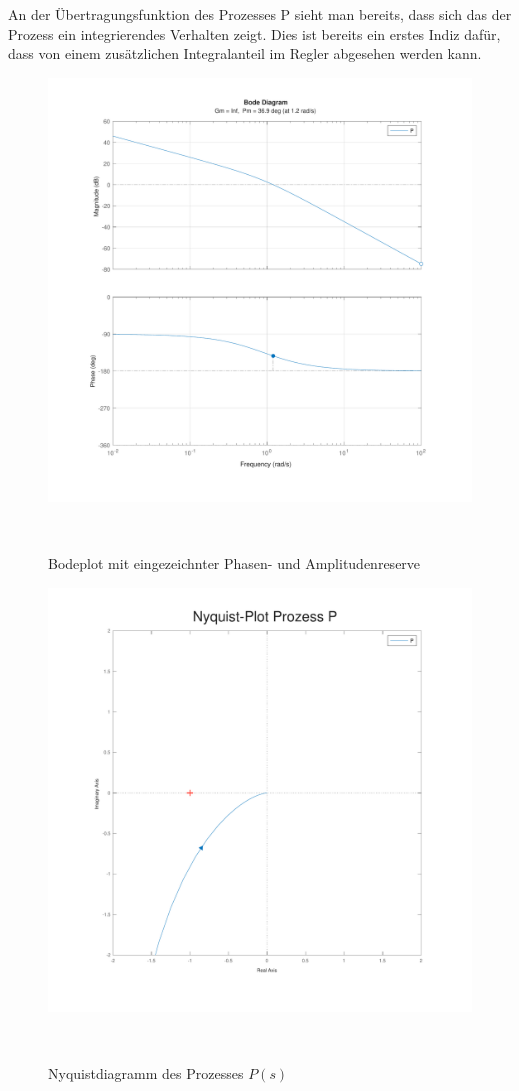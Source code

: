 \documentclass[main.tex]{subfiles} %
\begin{document}
An der Übertragungsfunktion des Prozesses P sieht man bereits, dass sich das
der Prozess ein integrierendes Verhalten zeigt. Dies ist bereits ein erstes
Indiz dafür, dass von einem zusätzlichen Integralanteil im Regler abgesehen
werden kann.

\begin{figure}[H]
    \centering
    \includegraphics[width=1\linewidth]{fig_Parametrierung_Linienfolgeregler/Bode_Plot_Prozess.pdf}
    \caption{Bodeplot mit eingezeichnter Phasen- und Amplitudenreserve}~\label{fig:MarginPlot_raw}
\end{figure}

\begin{figure}[H]
    \centering
    \includegraphics[width=0.75\linewidth]{fig_Parametrierung_Linienfolgeregler/NyquistPlot_System.pdf}
    \caption{Nyquistdiagramm des Prozesses $P(s)$}~\label{fig:Nyquist_raw}
\end{figure}
\end{document}

